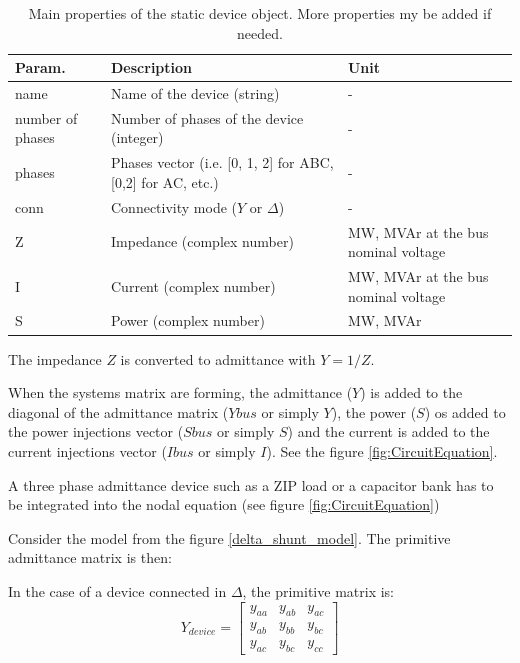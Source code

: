 \documentclass[nols,a4paper,twoside,symmetric,notoc,fleqn]{tufte-book}
\begin{document}
\begin{table}[h!]
	\begin{tabular}{|p{2cm}|p{3cm}|p{4cm}|}
		\hline 
		\rowcolor{maincolor}
		{\color{white} Param.} & {\color{white} Description} & {\color{white} Unit} \\ 
		\hline 
		name & Name of the device (string) & - \\ 
		\hline 
		number of phases & Number of phases of the device (integer) & - \\ 
		\hline 
		phases & Phases vector (i.e. [0, 1, 2] for ABC, [0,2] for AC, etc.) &- \\ 
		\hline 
		conn & Connectivity mode ($Y$ or $\Delta$) & - \\ 
		\hline 
		Z & Impedance (complex number) & MW, MVAr at the bus nominal voltage \\ 
		\hline 
		I & Current (complex number) & MW, MVAr at the bus nominal voltage \\ 
		\hline 
		S & Power (complex number) & MW, MVAr \\ 
		\hline
	\end{tabular} 
	\caption{Main properties of the static device object. More properties my be added if needed.}
\end{table}

\vspace{0.5cm}

The impedance $Z$ is converted to admittance with $Y=1/Z$.

When the systems matrix are forming, the admittance ($Y$) is added to the diagonal of the admittance matrix ($Ybus$ or simply $Y$), the power ($S$) os added to the power injections vector ($Sbus$ or simply $S$) and the current is added to the current injections vector ($Ibus$ or simply $I$). See the figure \ref{fig:CircuitEquation}.

A three phase admittance device such as a ZIP load or a capacitor bank has to be integrated into the nodal equation (see figure \ref{fig:CircuitEquation})

Consider the model from the figure \ref{delta_shunt_model}. The primitive admittance matrix is then:

In the case of a device connected in $\Delta$, the primitive matrix is:
\begin{equation}
Y_{device} = \left[ \begin{array}{ccc}
y_{aa} & y_{ab} &  y_{ac} \\
y_{ab} & y_{bb} & y_{bc} \\  
y_{ac} & y_{bc} & y_{cc}
\end{array} \right] 
\end{equation}
\end{document}
